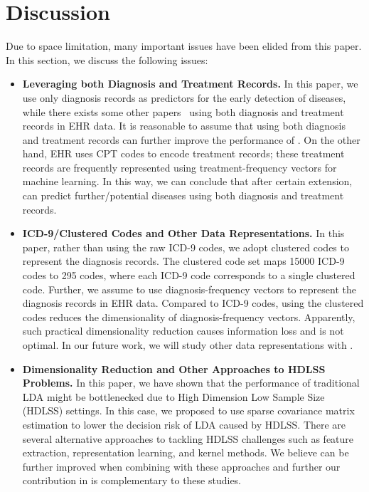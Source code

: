 \section{Discussion}
\label{sec:6}

Due to space limitation, many important issues  have been elided from this paper. 
In this section, we discuss the following issues:
\begin{itemize}
\item \textbf{Leveraging both Diagnosis and Treatment Records. } In this paper, we use only diagnosis records as predictors for the early detection of diseases, while there exists some other papers~\cite{wang_towards_2012,liu_temporal_2015,gotz_methodology_2014} using both diagnosis and treatment records in EHR data. 
It is reasonable to assume that using both diagnosis and treatment records can further improve the performance of \TheName{}. 
On the other hand, EHR uses CPT codes to encode treatment records; these treatment records are frequently represented using treatment-frequency vectors for machine learning. 
In this way, we can conclude that after certain extension, \TheName{} can predict further/potential diseases using both diagnosis and treatment records.

\item \textbf{ICD-9/Clustered Codes and Other Data Representations. } In this paper, rather than using the raw ICD-9 codes, we adopt clustered codes to represent the diagnosis records.  
The clustered code set maps 15000 ICD-9 codes to 295 codes, where each ICD-9 code corresponds to a single clustered code. 
Further, we assume to use diagnosis-frequency vectors to represent the diagnosis records in EHR data. 
Compared to ICD-9 codes, using the clustered codes reduces the dimensionality of diagnosis-frequency vectors. 
Apparently, such practical dimensionality reduction causes information loss and is not optimal. 
In our future work, we will study other data representations with \TheName{}.

\item \textbf{Dimensionality Reduction and Other Approaches to HDLSS Problems. } In this paper, we have shown that the performance of traditional LDA might be bottlenecked due to High Dimension Low Sample Size (HDLSS) settings. 
In this case, we proposed to use sparse covariance matrix estimation to lower the decision risk of LDA caused by HDLSS. 
There are several alternative approaches to tackling HDLSS challenges such as feature extraction, representation learning, and kernel methods. 
We believe \TheName{} can be further improved when combining with these approaches and further our contribution in \TheName{} is complementary to these studies.


\end{itemize}
